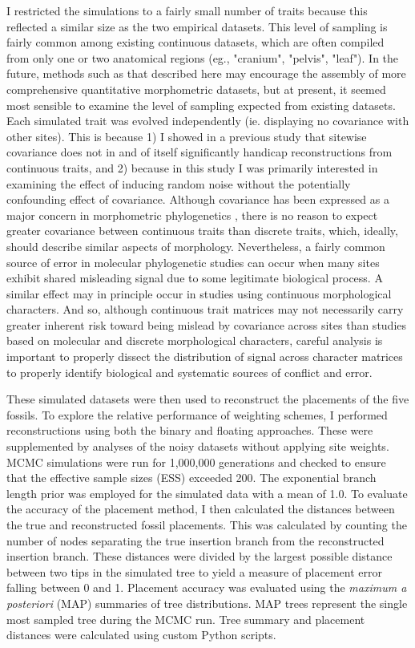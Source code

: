 \documentclass[12pt]{article}
\begin{document}
I restricted the simulations to a fairly small number of traits because
this reflected a similar size as the two empirical datasets.
This level of sampling is fairly common among existing continuous
datasets, which are often compiled from only one or two anatomical regions (eg., "cranium", "pelvis", "leaf"). 
In the future, methods such as that described here may encourage the assembly of more comprehensive quantitative morphometric datasets, but
at present, it seemed most sensible to examine the level of sampling
expected from existing datasets. Each simulated trait was evolved independently (ie. displaying no covariance with other sites). 
This is because 1) I showed in a previous study \citep{parins2017use}
that sitewise covariance does not in and of itself significantly handicap reconstructions from
continuous traits, and 2) because in this study I was primarily
interested in examining the effect of inducing random noise without the
potentially confounding effect of covariance. Although covariance has
been expressed as a major concern in morphometric phylogenetics
\citep{felsenstein1988phylogenies,felsenstein2002quantitative}, there is no reason to expect greater
covariance between continuous traits than discrete traits, which,
ideally, should describe similar aspects of morphology. Nevertheless, a fairly
common source of error  in molecular phylogenetic studies can occur when many sites 
exhibit shared misleading signal due to some legitimate biological process.
A similar effect may in principle occur in studies using continuous morphological characters.
And so, although continuous trait matrices may not necessarily carry greater inherent risk
toward being mislead by covariance across sites than studies based on molecular and discrete morphological characters, 
careful analysis is important to properly dissect the distribution of signal across character matrices
to properly identify biological and systematic sources of conflict and error.

These simulated datasets were then used to reconstruct the placements of
the five fossils. To explore the relative performance of weighting
schemes, I performed reconstructions using both the binary and floating
approaches. These were supplemented by analyses of the noisy datasets
without applying site weights. MCMC simulations were run for 1,000,000
generations and checked to ensure that the effective sample sizes (ESS)
exceeded 200. The exponential branch length prior was employed for the
simulated data with a mean of 1.0. To evaluate the accuracy of the
placement method, I then calculated the distances between the true and
reconstructed fossil placements. This was calculated by counting the
number of nodes separating the true insertion branch from the
reconstructed insertion branch. These distances were divided by the largest possible 
distance between two tips in the simulated tree to yield a measure of placement error falling between 0 and 1.
 Placement accuracy was evaluated using the
\emph{maximum a posteriori} (MAP) summaries of tree distributions. MAP
trees represent the single most sampled tree during the MCMC run.
Tree summary and placement distances
were calculated using custom Python scripts.
\end{document}
